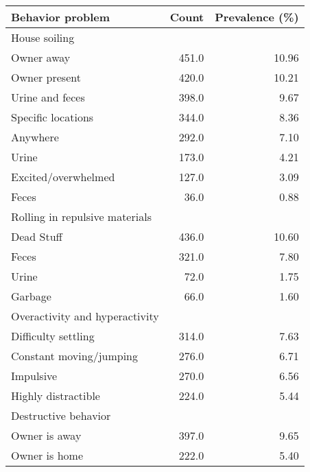 \documentclass[varwidth=\maxdimen]{standalone}
\newcommand{\subrow}[1]{\hspace{1.25em}#1}
\begin{document}
\begin{tabular}[t]{lrr}
\toprule
Behavior problem &  Count &  Prevalence (\%) \\
\midrule
House soiling \\
  \subrow{Owner away}                          &      451.0 &           10.96 \\
  \subrow{Owner present}                       &      420.0 &           10.21 \\
  \subrow{Urine and feces}                     &      398.0 &            9.67 \\
  \subrow{Specific locations}                  &      344.0 &            8.36 \\
  \subrow{Anywhere}                            &      292.0 &            7.10 \\
  \subrow{Urine}                               &      173.0 &            4.21 \\
  \subrow{Excited/overwhelmed}                 &      127.0 &            3.09 \\
  \subrow{Feces}                               &       36.0 &            0.88 \\
Rolling in repulsive materials \\
  \subrow{Dead Stuff}                          &      436.0 &           10.60 \\
  \subrow{Feces}                               &      321.0 &            7.80 \\
  \subrow{Urine}                               &       72.0 &            1.75 \\
  \subrow{Garbage}                             &       66.0 &            1.60 \\
Overactivity and hyperactivity \\
  \subrow{Difficulty settling}                 &      314.0 &            7.63 \\
  \subrow{Constant moving/jumping}             &      276.0 &            6.71 \\
  \subrow{Impulsive}                           &      270.0 &            6.56 \\
  \subrow{Highly distractible}                 &      224.0 &            5.44 \\
Destructive behavior \\
  \subrow{Owner is away}                       &      397.0 &            9.65 \\
  \subrow{Owner is home}                       &      222.0 &            5.40 \\

\end{tabular}
\end{document}
